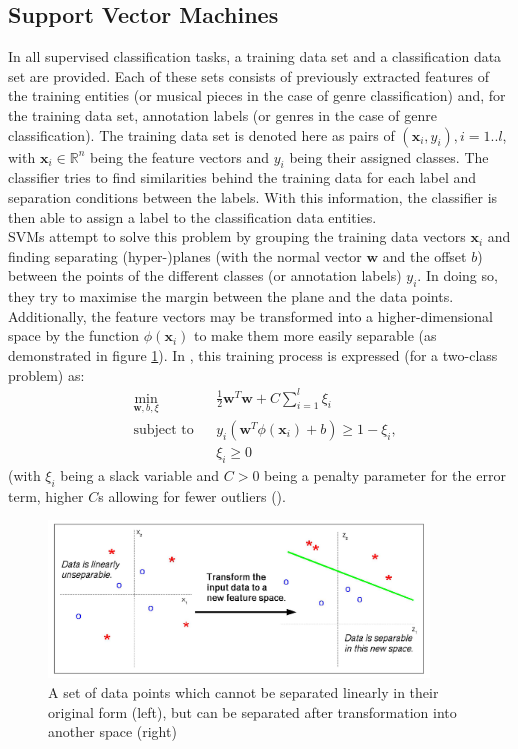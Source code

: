 \subsection{Support Vector Machines}
In all supervised classification tasks, a training data set and a classification data set are provided. Each of these sets consists of previously extracted features of the training entities (or musical pieces in the case of genre classification) and, for the training data set, annotation labels (or genres in the case of genre classification). The training data set is denoted here as pairs of $\left(\mathbf{x}_{i}, y_{i}\right), i=1..l$, with $\textbf{x}_i \in \mathbb{R}^{n}$ being the feature vectors and $y_{i}$ being their assigned classes. The classifier tries to find similarities behind the training data for each label and separation conditions between the labels. With this information, the classifier is then able to assign a label to the classification data entities.\\
SVMs attempt to solve this problem by grouping the training data vectors $\mathbf{x}_{i}$ and finding separating (hyper-)planes (with the normal vector $\mathbf{w}$ and the offset $b$) between the points of the different classes (or annotation labels) $y_{i}$. In doing so, they try to maximise the margin between the plane and the data points. Additionally, the feature vectors may be transformed into a higher-dimensional space by the function $\phi(\textbf{x}_i)$ to make them more easily separable (as demonstrated in figure \ref{fig:svm_transformation}).\newpage
In \cite{techreport:practical_svm}, this training process is expressed (for a two-class problem) as:
\begin{equation*}
\begin{aligned}
& \min\limits_{\mathbf{w},b,\xi} & & \frac{1}{2}\mathbf{w}^{T}\mathbf{w} + C \sum\limits_{i=1}^{l}\xi_{i} \\
& \text{subject to} & & y_{i}(\mathbf{w}^{T} \phi(\mathbf{x}_{i})+b) \geq 1-\xi_{i} , \\
&&& \xi_{i} \geq 0
\end{aligned}
\end{equation*}
(with $\xi_{i}$ being a slack variable and $C > 0$ being a penalty parameter for the error term, higher $C$s allowing for fewer outliers (\cite{article:intro_svm}).
\begin{figure}[htbp]
	\centering
	\includegraphics[width=0.9\textwidth]{images/svm_transformation.png}
	\caption{A set of data points which cannot be separated linearly in their original form (left), but can be separated after transformation into another space (right) \cite{article:intro_svm}}
	\label{fig:svm_transformation}
\end{figure}
